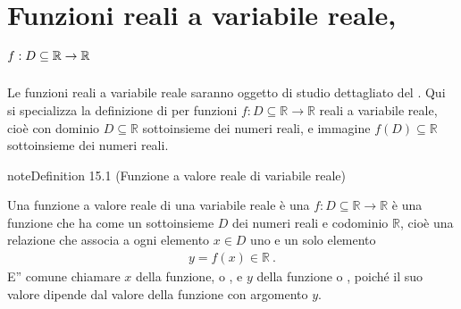 \documentclass[letterpaper,10pt,italian]{jupyterBook}
\begin{document}
\chapter{Funzioni reali a variabile reale, \protect\(f: D \subseteq \mathbb{R} \rightarrow \mathbb{R}\protect\)}
\label{\detokenize{ch/precalculus/real-functions:funzioni-reali-a-variabile-reale-f-d-subseteq-mathbb-r-rightarrow-mathbb-r}}\label{\detokenize{ch/precalculus/real-functions:math-hs-precalculus-real-functions}}\label{\detokenize{ch/precalculus/real-functions::doc}}
\sphinxAtStartPar
Le funzioni reali a variabile reale saranno oggetto di studio dettagliato del {\hyperref[\detokenize{ch/infinitesimal_calculus/analysis:infinitesimal-calculus-analysis}]{}}. Qui si specializza la definizione di {\hyperref[\detokenize{ch/set:math-hs-fun}]{}} per funzioni \(f: D \subseteq \mathbb{R} \rightarrow \mathbb{R}\) reali a variabile reale, cioè con dominio \(D \subseteq \mathbb{R}\) sottoinsieme dei numeri reali, e immagine \(f(D) \subseteq \mathbb{R}\) sottoinsieme dei numeri reali.
\label{ch/precalculus/real-functions:precalculus-real-fun}
\begin{sphinxadmonition}{note}{Definition 15.1 (Funzione a valore reale di variabile reale)}



\sphinxAtStartPar
Una funzione a valore reale di una variabile reale è una {\hyperref[\detokenize{ch/set:math-hs-fun}]{}} \(f: D \subseteq \mathbb{R} \rightarrow \mathbb{R}\) è una funzione che ha come  un sottoinsieme \(D\) dei numeri reali e codominio \(\mathbb{R}\), cioè una relazione che associa a ogni elemento \(x \in D\) uno e un solo elemento
\begin{equation*}
\begin{split}y = f(x) \in \mathbb{R} \ .\end{split}
\end{equation*}
\sphinxAtStartPar
E” comune chiamare \(x\)  della funzione, o , e \(y\)  della funzione o , poiché il suo valore dipende dal valore della funzione con argomento \(y\).
\end{sphinxadmonition}
\end{document}
